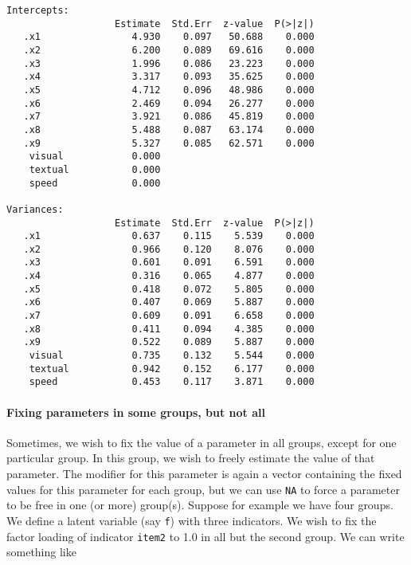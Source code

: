 \begin{verbatim}
Intercepts:
                   Estimate  Std.Err  z-value  P(>|z|)
   .x1                4.930    0.097   50.688    0.000
   .x2                6.200    0.089   69.616    0.000
   .x3                1.996    0.086   23.223    0.000
   .x4                3.317    0.093   35.625    0.000
   .x5                4.712    0.096   48.986    0.000
   .x6                2.469    0.094   26.277    0.000
   .x7                3.921    0.086   45.819    0.000
   .x8                5.488    0.087   63.174    0.000
   .x9                5.327    0.085   62.571    0.000
    visual            0.000                           
    textual           0.000                           
    speed             0.000                           

Variances:
                   Estimate  Std.Err  z-value  P(>|z|)
   .x1                0.637    0.115    5.539    0.000
   .x2                0.966    0.120    8.076    0.000
   .x3                0.601    0.091    6.591    0.000
   .x4                0.316    0.065    4.877    0.000
   .x5                0.418    0.072    5.805    0.000
   .x6                0.407    0.069    5.887    0.000
   .x7                0.609    0.091    6.658    0.000
   .x8                0.411    0.094    4.385    0.000
   .x9                0.522    0.089    5.887    0.000
    visual            0.735    0.132    5.544    0.000
    textual           0.942    0.152    6.177    0.000
    speed             0.453    0.117    3.871    0.000
\end{verbatim}

\hypertarget{fixing-parameters-in-some-groups-but-not-all}{%
\paragraph{Fixing parameters in some groups, but not
all}\label{fixing-parameters-in-some-groups-but-not-all}}

Sometimes, we wish to fix the value of a parameter in all groups, except
for one particular group. In this group, we wish to freely estimate the
value of that parameter. The modifier for this parameter is again a
vector containing the fixed values for this parameter for each group,
but we can use \texttt{NA} to force a parameter to be free in one (or
more) group(s). Suppose for example we have four groups. We define a
latent variable (say \texttt{f}) with three indicators. We wish to fix
the factor loading of indicator \texttt{item2} to 1.0 in all but the
second group. We can write something like

